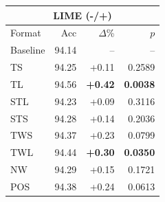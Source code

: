 \begin{tabular}{lrrr}
\toprule
\multicolumn{4}{c}{\textbf{LIME (-/+)}} \\
\midrule
Format & Acc & $\Delta$\% & $p$ \\
\midrule
Baseline & 94.14 & -- & -- \\
\midrule
TS & 94.25 & +0.11 & 0.2589 \\
TL & 94.56 & \textbf{+0.42} & \textbf{0.0038} \\
STL & 94.23 & +0.09 & 0.3116 \\
STS & 94.28 & +0.14 & 0.2036 \\
TWS & 94.37 & +0.23 & 0.0799 \\
TWL & 94.44 & \textbf{+0.30} & \textbf{0.0350} \\
NW & 94.29 & +0.15 & 0.1721 \\
POS & 94.38 & +0.24 & 0.0613 \\
\bottomrule
\end{tabular}